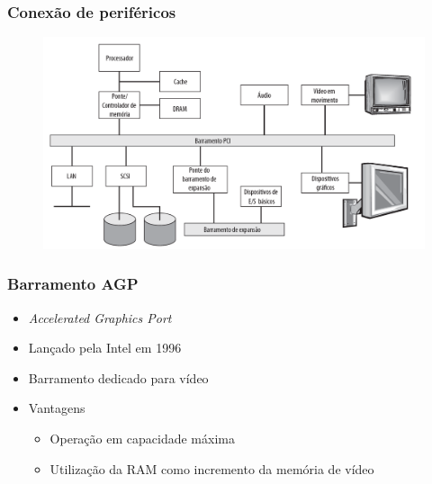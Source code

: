 \documentclass[aspectratio=169,
				xcolor=table]{beamer}
\begin{document}
	\begin{frame}
		\frametitle{Conexão de periféricos}
		\begin{figure}[hbtp]
		\centering
		\includegraphics[height=.75\textheight]{../figs/cap11/pci.png}
		\end{figure}
		
	\end{frame}	
	
	\begin{frame}
		\frametitle{Barramento AGP}
		\begin{itemize}
			\item \textit{Accelerated Graphics Port} 
			\vspace{1em}
			\item Lançado pela Intel em 1996 
			\vspace{1em}
			\item Barramento dedicado para vídeo 
			\vspace{1em}
			\item Vantagens
			\begin{itemize}
				\item Operação em capacidade máxima
				\item Utilização da RAM como incremento da memória de vídeo
			\end{itemize}
		\end{itemize}
	\end{frame}
	
\end{document}
